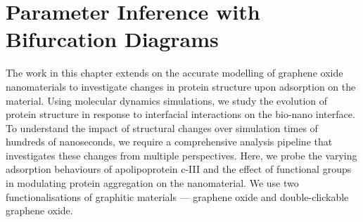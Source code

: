 \chapter{Parameter Inference with Bifurcation Diagrams}
\label{chapter:inference}



The work in this chapter extends on the accurate modelling of graphene oxide nanomaterials to investigate changes in protein structure upon adsorption on the material. Using molecular dynamics simulations, we study the evolution of protein structure in response to interfacial interactions on the bio-nano interface. To understand the impact of structural changes over simulation times of hundreds of nanoseconds, we require a comprehensive analysis pipeline that investigates these changes from multiple perspectives. Here, we probe the varying adsorption behaviours of apolipoprotein c-III and the effect of functional groups in modulating protein aggregation on the nanomaterial. We use two functionalisations of graphitic materials --- graphene oxide and double-clickable graphene oxide.

\clearpage


